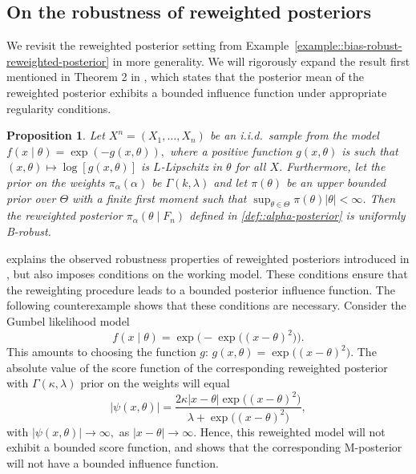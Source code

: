 \documentclass[11pt, oneside]{amsart}
\newtheorem{proposition}{Proposition}
\theoremstyle{definition}   %
\begin{document}
\subsection{On the robustness of reweighted posteriors}
%
We revisit the reweighted posterior setting from Example~\ref{example::bias-robust-reweighted-posterior} in more generality. We will rigorously expand the result first mentioned in Theorem 2 in \cite{wang:kucukelbir:blei2017}, which states that the posterior mean of the reweighted posterior exhibits a bounded influence function under appropriate regularity conditions. 
%
\begin{proposition}
\label{prop::bounded-PIF-of-reweighted-posteriors}
    Let \( X^n = (X_1, \ldots, X_n)\) be an i.i.d.\ sample from the model
   $f(x \mid \theta) = \exp (-g(x, \theta)),$
    where a positive function \(g(x, \theta)\) is such that \( (x, \theta) \mapsto \log  [ g(x, \theta)  ]\) is \(L\)-Lipschitz in \( \theta\) for all \(X\).
    Furthermore, let the prior on the weights \( \pi_\alpha (\alpha)  \) be \( \Gamma(k, \lambda) \) and let \( \pi(\theta) \) be an upper bounded prior over \( \Theta \) with a finite first moment such that \( \sup_{\theta \in \Theta} \pi(\theta) | \theta | < \infty \). Then the reweighted posterior \( \pi_\alpha(\theta \mid F_n) \) defined in \eqref{def::alpha-posterior} is uniformly B-robust.
\end{proposition}
%

 explains the observed robustness properties of reweighted posteriors introduced in \cite{wang:kucukelbir:blei2017}, but also imposes conditions on the working model. These conditions ensure that the reweighting procedure leads to a bounded posterior influence function.  The following counterexample shows that these conditions are necessary. 
%
Consider the Gumbel  likelihood model 
\[
f(x \mid \theta) = \exp \bigl ( - \exp \bigl ((x - \theta) ^2 \bigr) \bigr).
\]
This amounts to choosing the  function \(g \):
\(
g(x, \theta) = \exp \bigl ((x - \theta) ^2 \bigr).
\)
The absolute value of the score function of the corresponding reweighted posterior with \( \Gamma(\kappa, \lambda) \) prior on the weights will equal
\[
\left | \psi(x, \theta) \right | = \frac{2\kappa |x- \theta| \exp \bigl ((x - \theta) ^2 \bigr) }{\lambda + \exp \bigl ((x - \theta) ^2 \bigr)},
\]
with
\(
\left | \psi(x,\theta) \right | \rightarrow \infty,
\)
as \(| x - \theta | \rightarrow \infty\). Hence, this reweighted model will not exhibit a bounded score function, and  shows that the corresponding M-posterior will not have a bounded influence function.
\end{document}
